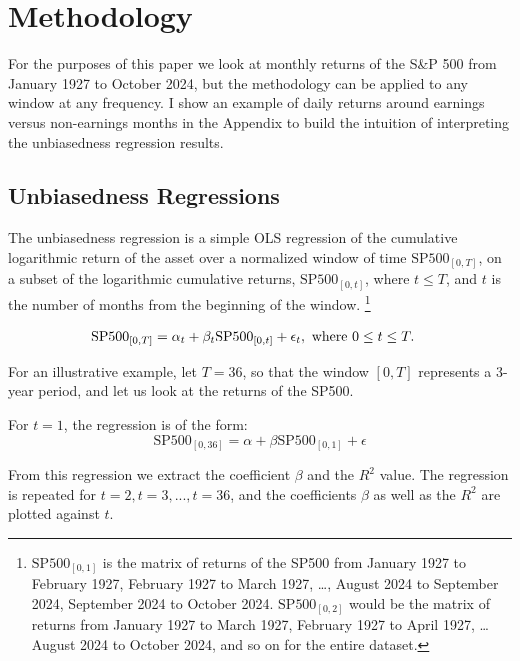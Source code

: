 \section{Methodology}

For the purposes of this paper we look at monthly returns of the S\&P 500 from January 1927 to October 2024, but the methodology can be 
applied to any window at any frequency. I show an example of daily returns around earnings versus non-earnings months in the Appendix to build the intuition
of interpreting the unbiasedness regression results.

\subsection{Unbiasedness Regressions}

\noindent The unbiasedness regression is a simple OLS regression of the cumulative logarithmic return of the asset over a normalized window of time $\mathrm{SP500}_{[0, T]}$, on a subset of the
logarithmic cumulative returns, $\mathrm{SP500}_{[0, t]}$, where $t \leq T$, and $t$ is the number of months from the beginning of the window. \footnote{$\mathrm{SP500}_{[0, 1]}$ is the matrix of returns of the SP500 from January 1927 to February 1927, February 1927 to March 1927, \dots, August 2024 to September 2024, September 2024 to October 2024.\newline
$\mathrm{SP500}_{[0, 2]}$ would be the matrix of returns from January 1927 to March 1927, February 1927 to April 1927, \dots August 2024 to October 2024, and so on for the entire dataset.}

\begin{equation}
    \begin{aligned}
        \mathrm{SP500}_{[0, T]} &= \alpha_t + \beta_t \mathrm{SP500}_{[0, t]} + \epsilon_{t}, \hfill \text{   where } 0 \leq t \leq T.
    \end{aligned}
\end{equation}

\noindent For an illustrative example, let $T = 36$, so that the window $[0, T]$ represents a 3-year period, and let us look at the returns of the SP500.

\noindent For $t=1$, the regression is of the form:
\begin{equation}
    \mathrm{SP500}_{[0, 36]} = \alpha + \beta \mathrm{SP500}_{[0, 1]} + \epsilon
\end{equation}

\noindent From this regression we extract the coefficient $\beta$ and the $R^2$ value.
The regression is repeated for $t=2, t=3, ..., t=36$, and the coefficients $\beta$ as well as the $R^2$ are plotted against $t$.

